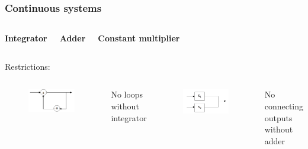 \documentclass{beamer}
\begin{document}
\begin{frame}
\frametitle{Continuous systems}

\begin{columns}[c]

\centering \textbf{Integrator}\\
\bigskip
{}

\centering \textbf{Adder}\\
\bigskip
{}

\centering \textbf{Constant multiplier}\\
\bigskip
{}

\end{columns}

\bigskip
Restrictions:
\begin{columns}[c]

\begin{figure}
\includegraphics[width=.85\linewidth]{loop}
\end{figure}
No loops without integrator

\begin{figure}
\includegraphics[width=.8\linewidth]{connected_output}
\end{figure}
No connecting outputs without adder

\end{columns}

\end{frame}
\end{document}
